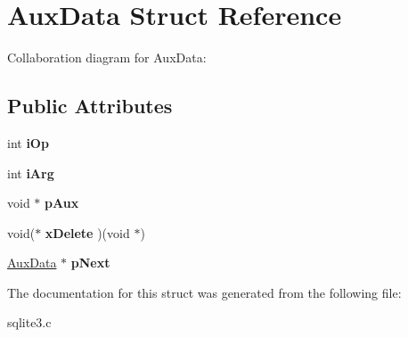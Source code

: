 \hypertarget{structAuxData}{}\section{Aux\+Data Struct Reference}
\label{structAuxData}


Collaboration diagram for Aux\+Data\+:
\subsection*{Public Attributes}
\begin{DoxyCompactItemize}
\item 
int {\bfseries i\+Op}\hypertarget{structAuxData_aaa45d5e867df81e58b886f4fe355364f}{}\label{structAuxData_aaa45d5e867df81e58b886f4fe355364f}

\item 
int {\bfseries i\+Arg}\hypertarget{structAuxData_aa0f1b63cbd4f0cf17c82d9ed17bbdc01}{}\label{structAuxData_aa0f1b63cbd4f0cf17c82d9ed17bbdc01}

\item 
void $\ast$ {\bfseries p\+Aux}\hypertarget{structAuxData_a3867fd2bd1f3795b14e858daa6754825}{}\label{structAuxData_a3867fd2bd1f3795b14e858daa6754825}

\item 
void($\ast$ {\bfseries x\+Delete} )(void $\ast$)\hypertarget{structAuxData_ae2c39019bc42d3650d21d9b4f8692400}{}\label{structAuxData_ae2c39019bc42d3650d21d9b4f8692400}

\item 
\hyperlink{structAuxData}{Aux\+Data} $\ast$ {\bfseries p\+Next}\hypertarget{structAuxData_af63a17e0ce6af2de969caccb25ef3945}{}\label{structAuxData_af63a17e0ce6af2de969caccb25ef3945}

\end{DoxyCompactItemize}


The documentation for this struct was generated from the following file\+:\begin{DoxyCompactItemize}
\item 
sqlite3.\+c\end{DoxyCompactItemize}
